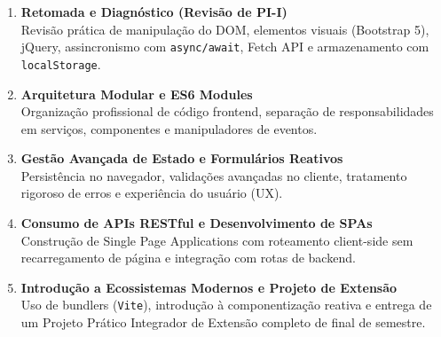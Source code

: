 \begin{enumerate}
    \item \textbf{Retomada e Diagnóstico (Revisão de PI-I)} \\
    Revisão prática de manipulação do DOM, elementos visuais (Bootstrap 5), jQuery, assincronismo com \texttt{async/await}, Fetch API e armazenamento com \texttt{localStorage}.

    \item \textbf{Arquitetura Modular e ES6 Modules} \\
    Organização profissional de código frontend, separação de responsabilidades em serviços, componentes e manipuladores de eventos.

    \item \textbf{Gestão Avançada de Estado e Formulários Reativos} \\
    Persistência no navegador, validações avançadas no cliente, tratamento rigoroso de erros e experiência do usuário (UX).

    \item \textbf{Consumo de APIs RESTful e Desenvolvimento de SPAs} \\
    Construção de Single Page Applications com roteamento client-side sem recarregamento de página e integração com rotas de backend.

    \item \textbf{Introdução a Ecossistemas Modernos e Projeto de Extensão} \\
    Uso de bundlers (\texttt{Vite}), introdução à componentização reativa e entrega de um Projeto Prático Integrador de Extensão completo de final de semestre.
\end{enumerate}

